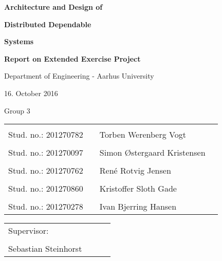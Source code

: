 
\centerline{\Huge\bfseries\color{ThemeColor} Architecture and Design of}
\vspace{0.5em}
\centerline{\Huge\bfseries\color{ThemeColor} Distributed Dependable}
\vspace{0.5em}
\centerline{\Huge\bfseries\color{ThemeColor} Systems}

\vspace{2em}
\centerline{\Large\bfseries\color{BlackColor} Report on Extended Exercise Project}



\vspace{5em}
\centerline{\large\bfseries\color{BlackColor}}
\centerline{\large\color{BlackColor}Department of Engineering - Aarhus University}
\vspace{0.5em}
\centerline{\large\color{BlackColor} 16. October 2016}
\vspace{0.5em}
\centerline{\large\color{BlackColor} Group 3}

\vspace{15em}

\begin{center}
   \begin{tabular}{ l p{3cm} l l }
   &&&\\
   Stud. no.: 201270782 && Torben Werenberg Vogt & \\\hline
   &&& \\
   Stud. no.: 201270097 && Simon Østergaard Kristensen & \\\hline
   &&& \\
   Stud. no.: 201270762 && René Rotvig Jensen & \\\hline
   &&& \\
   Stud. no.: 201270860 && Kristoffer Sloth Gade & \\\hline
   &&& \\
   Stud. no.: 201270278 &&  Ivan Bjerring Hansen & \\\hline
   \end{tabular}
\end{center}

\vspace{2em}
\begin{center}
	\begin{tabular}{ l p{8cm} l l }
		Supervisor: &&& \\
		&&&\\
		Sebastian Steinhorst &&& \\\hline
		\end{tabular}
		\end{center}
\thispagestyle{empty} %
\restoregeometry

